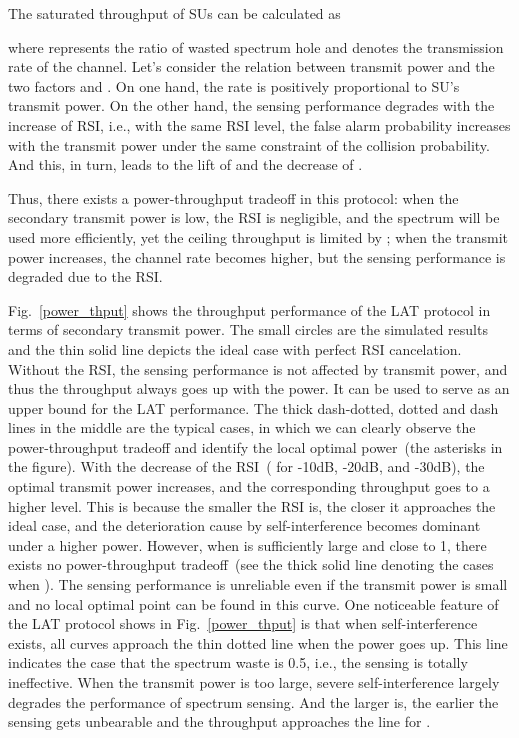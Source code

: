 \documentclass[onecolumn,12pt]{IEEEtran}
\begin{document}
The saturated throughput of SUs can be calculated as

where  represents the ratio of wasted spectrum hole and  denotes the transmission rate of the channel. Let's consider the relation between transmit power and the two factors  and . On one hand, the rate  is positively proportional to SU's transmit power. On the other hand, the sensing performance degrades with the increase of RSI, i.e., with the same RSI level, the false alarm probability increases with the transmit power under the same constraint of the collision probability\cite{liao2014gc}. And this, in turn, leads to the lift of  and the decrease of .

Thus, there exists a power-throughput tradeoff in this protocol: when the secondary transmit power is low, the RSI is negligible, and the spectrum will be used more efficiently, yet the ceiling throughput is limited by ; when the transmit power increases, the channel rate becomes higher, but the sensing performance is degraded due to the RSI.




Fig.~\ref{power_thput} shows the throughput performance of the LAT protocol in terms of secondary transmit power. The small circles are the simulated results and the thin solid line depicts the ideal case with perfect RSI cancelation. Without the RSI, the sensing performance is not affected by transmit power, and thus the throughput always goes up with the power. It can be used to serve as an upper bound for the LAT performance. The thick dash-dotted, dotted and dash lines in the middle are the typical cases, in which we can clearly observe the power-throughput tradeoff and identify the local optimal power~(the asterisks in the figure). With the decrease of the RSI~( for -10dB, -20dB, and -30dB), the optimal transmit power increases, and the corresponding throughput goes to a higher level. This is because the smaller the RSI is, the closer it approaches the ideal case, and the deterioration cause by self-interference becomes dominant under a higher power. However, when  is sufficiently large and close to 1, there exists no power-throughput tradeoff~(see the thick solid line denoting the cases when ). The sensing performance is unreliable even if the transmit power is small and no local optimal point can be found in this curve. One noticeable feature of the LAT protocol shows in Fig.~\ref{power_thput} is that when self-interference exists, all curves approach the thin dotted line  when the power goes up. This line indicates the case that the spectrum waste is 0.5, i.e., the sensing is totally ineffective. When the transmit power is too large, severe self-interference largely degrades the performance of spectrum sensing. And the larger  is, the earlier the sensing gets unbearable and the throughput approaches the line for .
\end{document}
